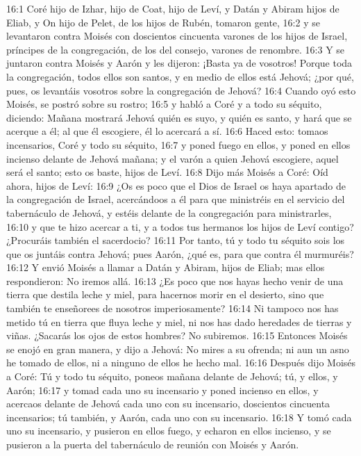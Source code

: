 16:1 Coré hijo de Izhar, hijo de Coat, hijo de Leví, y Datán y Abiram hijos de Eliab, y On hijo de Pelet, de los hijos de Rubén, tomaron gente,  
16:2 y se levantaron contra Moisés con doscientos cincuenta varones de los hijos de Israel, príncipes de la congregación, de los del consejo, varones de renombre.  
16:3 Y se juntaron contra Moisés y Aarón y les dijeron: ¡Basta ya de vosotros! Porque toda la congregación, todos ellos son santos, y en medio de ellos está Jehová; ¿por qué, pues, os levantáis vosotros sobre la congregación de Jehová?  
16:4 Cuando oyó esto Moisés, se postró sobre su rostro;  
16:5 y habló a Coré y a todo su séquito, diciendo: Mañana mostrará Jehová quién es suyo, y quién es santo, y hará que se acerque a él; al que él escogiere, él lo acercará a sí.  
16:6 Haced esto: tomaos incensarios, Coré y todo su séquito,  
16:7 y poned fuego en ellos, y poned en ellos incienso delante de Jehová mañana; y el varón a quien Jehová escogiere, aquel será el santo; esto os baste, hijos de Leví.  
16:8 Dijo más Moisés a Coré: Oíd ahora, hijos de Leví:  
16:9 ¿Os es poco que el Dios de Israel os haya apartado de la congregación de Israel, acercándoos a él para que ministréis en el servicio del tabernáculo de Jehová, y estéis delante de la congregación para ministrarles,  
16:10 y que te hizo acercar a ti, y a todos tus hermanos los hijos de Leví contigo? ¿Procuráis también el sacerdocio?  
16:11 Por tanto, tú y todo tu séquito sois los que os juntáis contra Jehová; pues Aarón, ¿qué es, para que contra él murmuréis?  
16:12 Y envió Moisés a llamar a Datán y Abiram, hijos de Eliab; mas ellos respondieron: No iremos allá.  
16:13 ¿Es poco que nos hayas hecho venir de una tierra que destila leche y miel, para hacernos morir en el desierto, sino que también te enseñorees de nosotros imperiosamente?  
16:14 Ni tampoco nos has metido tú en tierra que fluya leche y miel, ni nos has dado heredades de tierras y viñas. ¿Sacarás los ojos de estos hombres? No subiremos.  
16:15 Entonces Moisés se enojó en gran manera, y dijo a Jehová: No mires a su ofrenda; ni aun un asno he tomado de ellos, ni a ninguno de ellos he hecho mal.  
16:16 Después dijo Moisés a Coré: Tú y todo tu séquito, poneos mañana delante de Jehová; tú, y ellos, y Aarón;  
16:17 y tomad cada uno su incensario y poned incienso en ellos, y acercaos delante de Jehová cada uno con su incensario, doscientos cincuenta incensarios; tú también, y Aarón, cada uno con su incensario.  
16:18 Y tomó cada uno su incensario, y pusieron en ellos fuego, y echaron en ellos incienso, y se pusieron a la puerta del tabernáculo de reunión con Moisés y Aarón.  
